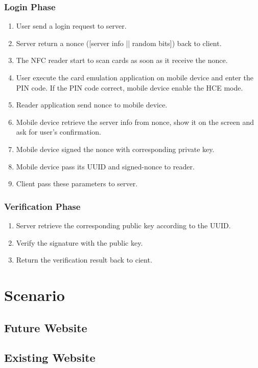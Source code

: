 \begin{CJK}{Bg5}{bsmi}
\subsubsection{Login Phase}

\begin{enumerate}
\item User send a login request to server.
\item Server return a nonce ([server info || random bits]) back to client.
\item The NFC reader start to scan cards as soon as it receive the nonce.
\item User execute the card emulation application on mobile device and enter the PIN code. If the PIN code correct, mobile device enable the HCE mode.
\item Reader application send nonce to mobile device.
\item Mobile device retrieve the server info from nonce, show it on the screen and ask for user's confirmation.
\item Mobile device signed the nonce with corresponding private key.
\item Mobile device pass its UUID and signed-nonce to reader.
\item Client pass these parameters to server.
\end{enumerate}

\subsubsection{Verification Phase}

\begin{enumerate}
\item Server retrieve the corresponding public key according to the UUID.
\item Verify the signature with the public key.
\item Return the verification result back to cient.
\end{enumerate}

\section{Scenario}

\subsection{Future Website}
\label{sec:future-website}

\subsection{Existing Website}


\end{CJK}
